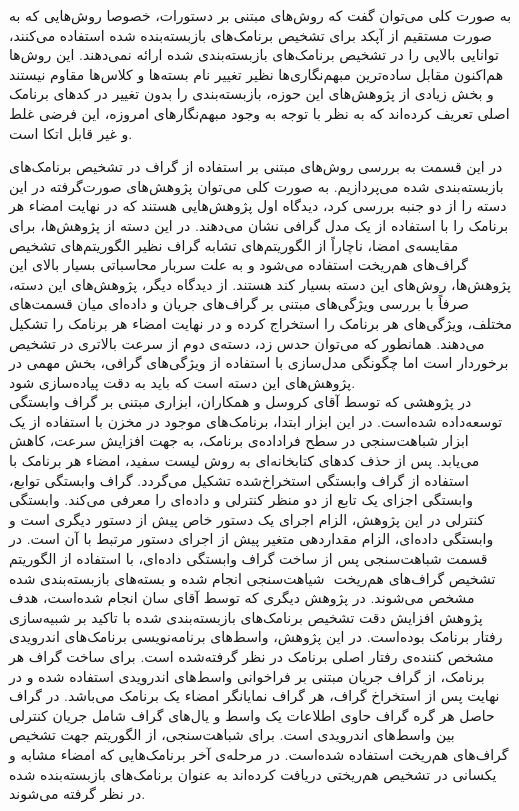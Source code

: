 به صورت کلی می‌توان گفت که روش‌های مبتنی بر دستورات، خصوصا روش‌هایی که به صورت مستقیم از آپکد برای تشخیص برنامک‌های بازبسته‌بنده شده استفاده می‌کنند، توانایی بالایی را در تشخیص برنامک‌های بازبسته‌بندی شده ارائه‌ نمی‌دهند. این روش‌ها هم‌اکنون مقابل ساده‌ترین مبهم‌نگاری‌ها نظیر تغییر نام بسته‌ها و کلاس‌ها مقاوم نیستند و بخش زیادی از پژوهش‌های این حوزه، بازبسته‌بندی را بدون تغییر در کد‌های برنامک اصلی تعریف کرده‌اند که به نظر با توجه به وجود مبهم‌نگارهای امروزه، این فرضی غلط و غیر قابل اتکا است.

در این قسمت به بررسی روش‌های مبتنی بر استفاده از گراف در تشخیص برنامک‌های بازبسته‌بندی شده می‌پردازیم. به صورت کلی می‌توان پژوهش‌های صورت‌گرفته در این دسته را از دو جنبه بررسی کرد، دیدگاه اول پژوهش‌هایی هستند که در نهایت امضاء هر برنامک را با استفاده از یک مدل گرافی نشان می‌دهند. در این دسته از پژوهش‌ها، برای مقایسه‌ی امضا، ناچاراً از الگوریتم‌های تشابه گراف نظیر الگوریتم‌های تشخیص گراف‌های هم‌ریخت استفاده می‌شود و به علت سربار محاسباتی بسیار بالای این پژوهش‌ها، روش‌های این دسته بسیار کند هستند. از دیدگاه دیگر، پژوهش‌های این دسته، صرفاً با بررسی ویژگی‌های مبتنی بر گراف‌های جریان و داده‌ای میان قسمت‌‌های مختلف، ویژگی‌های هر برنامک را استخراج کرده و در نهایت امضاء هر برنامک را تشکیل می‌دهند. همانطور که می‌توان حدس زد، دسته‌ی دوم از سرعت بالاتری در تشخیص برخوردار است اما چگونگی مدل‌سازی با استفاده از ویژگی‌های گرافی، بخش مهمی در پژوهش‌های این دسته است که باید به دقت پیاده‌سازی شود.\\
در پژوهشی که توسط آقای کروسل و همکاران، ابزاری مبتنی بر گراف وابستگی توسعه‌داده‌ شده‌است. در این ابزار ابتدا، برنامک‌های موجود در مخزن با استفاده از یک ابزار شباهت‌سنجی در سطح فراداده‌‌ی برنامک، به جهت افزایش سرعت، کاهش می‌یابد. پس از حذف کد‌های کتابخانه‌ای به روش لیست سفید، امضاء هر برنامک با استفاده از گراف وابستگی استخراخ‌شده تشکیل می‌گردد. گراف وابستگی توابع، وابستگی اجزای یک تابع از دو منظر کنترلی و داده‌ای را معرفی می‌کند. وابستگی کنترلی‌ در این پژوهش، الزام اجرای یک دستور خاص پیش از دستور دیگری است و وابستگی داده‌ای‌، الزام مقداردهی متغیر پیش از اجرای دستور مرتبط با آن است. در قسمت شباهت‌سنجی پس از ساخت گراف وابستگی داده‌ای، با استفاده از الگوریتم تشخیص گراف‌های هم‌ریخت ‌ شیاهت‌سنجی انجام شده و بسته‌های بازبسته‌بندی شده مشخص می‌شوند. در پژوهش دیگری که توسط آقای سان انجام‌ شده‌است، هدف پژوهش افزایش دقت تشخیص برنامک‌های بازبسته‌بندی شده با تاکید بر شبیه‌سازی رفتار برنامک بوده‌است. در این پژوهش، واسط‌های برنامه‌نویسی برنامک‌های اندرویدی مشخص کننده‌ی رفتار اصلی برنامک در نظر گرفته‌شده است. برای ساخت گراف هر برنامک، از گراف جریان مبتنی بر فراخوانی واسط‌های اندرویدی استفاده شده و در نهایت پس از استخراخ گراف، هر گراف نمایانگر امضاء یک برنامک می‌باشد. در گراف حاصل هر گره گراف حاوی اطلاعات یک واسط و یال‌های گراف شامل جریان کنترلی بین واسط‌های اندرویدی است. برای شباهت‌سنجی، از الگوریتم  جهت تشخیص گراف‌های هم‌ریخت استفاده شده‌است. در مرحله‌ی آخر برنامک‌هایی که امضا‌ء مشابه و یکسانی در تشخیص هم‌ریختی دریافت کرده‌اند به عنوان برنامک‌های بازبسته‌بنده شده در نظر گرفته می‌شوند.\\
